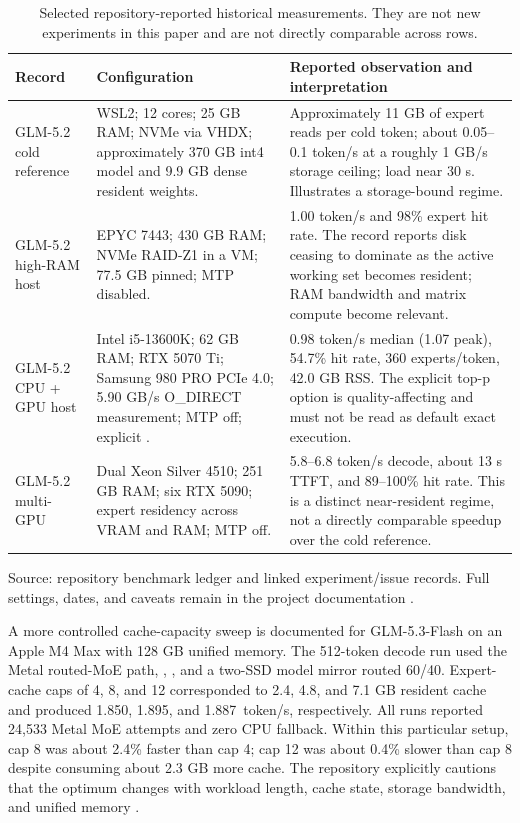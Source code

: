 \documentclass[10pt,twocolumn]{article}
\newcommand{\code}[1]{\texttt{\small\detokenize{#1}}}
\newcommand{\tok}{\,token/s}
\begin{document}
\begin{table}[t]
\centering
\caption{Selected repository-reported historical measurements. They are not new experiments in this paper and are not directly comparable across rows.}
\label{tab:benchmarks}
\scriptsize
\setlength{\tabcolsep}{5pt}
\renewcommand{\arraystretch}{1.16}
\begin{tabularx}{\textwidth}{@{}p{}p{}X@{}}
\toprule
\textbf{Record} & \textbf{Configuration} & \textbf{Reported observation and interpretation}\\
\midrule
GLM-5.2 cold reference & WSL2; 12 cores; 25 GB RAM; NVMe via VHDX; approximately 370 GB int4 model and 9.9 GB dense resident weights. & Approximately 11 GB of expert reads per cold token; about 0.05--0.1 token/s at a roughly 1 GB/s storage ceiling; load near 30 s. Illustrates a storage-bound regime.\\
\addlinespace
GLM-5.2 high-RAM host & EPYC 7443; 430 GB RAM; NVMe RAID-Z1 in a VM; 77.5 GB pinned; MTP disabled. & 1.00 token/s and 98\% expert hit rate. The record reports disk ceasing to dominate as the active working set becomes resident; RAM bandwidth and matrix compute become relevant.\\
\addlinespace
GLM-5.2 CPU + GPU host & Intel i5-13600K; 62 GB RAM; RTX 5070 Ti; Samsung 980 PRO PCIe 4.0; 5.90 GB/s O\_DIRECT measurement; MTP off; explicit \code{--topp 0.7}. & 0.98 token/s median (1.07 peak), 54.7\% hit rate, 360 experts/token, 42.0 GB RSS. The explicit top-p option is quality-affecting and must not be read as default exact execution.\\
\addlinespace
GLM-5.2 multi-GPU & Dual Xeon Silver 4510; 251 GB RAM; six RTX 5090; expert residency across VRAM and RAM; MTP off. & 5.8--6.8 token/s decode, about 13 s TTFT, and 89--100\% hit rate. This is a distinct near-resident regime, not a directly comparable speedup over the cold reference.\\
\bottomrule
\end{tabularx}
\vspace{0.25em}
\footnotesize Source: repository benchmark ledger and linked experiment/issue records. Full settings, dates, and caveats remain in the project documentation \cite{qoralisbench}.
\end{table}

A more controlled cache-capacity sweep is documented for GLM-5.3-Flash on an Apple M4 Max with 128 GB unified memory. The 512-token decode run used the Metal routed-MoE path, \code{--ram 96}, \code{--ctx 8192}, and a two-SSD model mirror routed 60/40. Expert-cache caps of 4, 8, and 12 corresponded to 2.4, 4.8, and 7.1 GB resident cache and produced 1.850, 1.895, and 1.887 \tok, respectively. All runs reported 24,533 Metal MoE attempts and zero CPU fallback. Within this particular setup, cap 8 was about 2.4\% faster than cap 4; cap 12 was about 0.4\% slower than cap 8 despite consuming about 2.3 GB more cache. The repository explicitly cautions that the optimum changes with workload length, cache state, storage bandwidth, and unified memory \cite{qoralisbench}.
\end{document}
